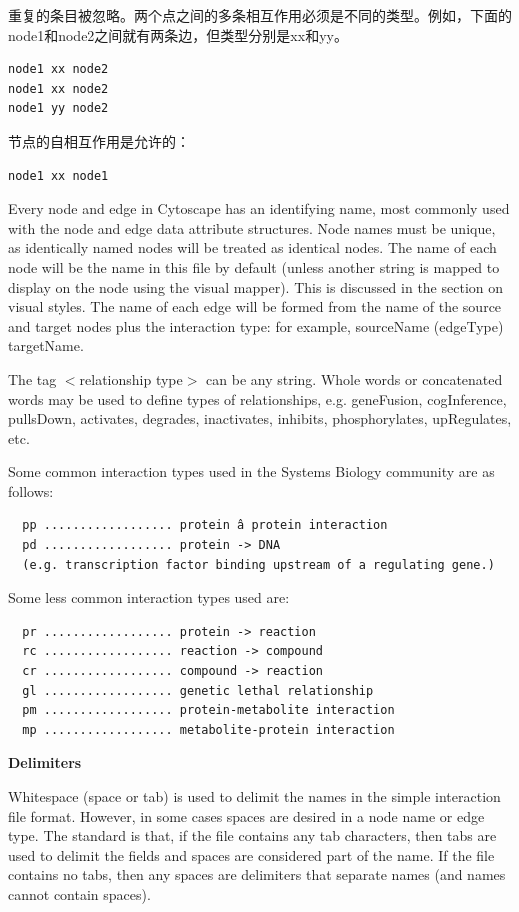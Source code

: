 重复的条目被忽略。两个点之间的多条相互作用必须是不同的类型。例如，下面的node1和node2之间就有两条边，但类型分别是xx和yy。
\begin{verbatim}
node1 xx node2
node1 xx node2
node1 yy node2
\end{verbatim}

节点的自相互作用是允许的：
\begin{verbatim}
node1 xx node1
\end{verbatim}

 Every node and edge in Cytoscape has an identifying name, most commonly used with the node and edge data attribute structures. Node names must be unique, as identically named nodes will be treated as identical nodes. The name of each node will be the name in this file by default (unless another string is mapped to display on the node using the visual mapper). This is discussed in the section on visual styles. The name of each edge will be formed from the name of the source and target nodes plus the interaction type: for example, sourceName (edgeType) targetName. 


 The tag $<$relationship type$>$ can be any string. Whole words or concatenated words may be used to define types of relationships, e.g. geneFusion, cogInference, pullsDown, activates, degrades, inactivates, inhibits, phosphorylates, upRegulates, etc. 


 Some common interaction types used in the Systems Biology community are as follows: 
\begin{verbatim}
  pp .................. protein â protein interaction
  pd .................. protein -> DNA   
  (e.g. transcription factor binding upstream of a regulating gene.)

\end{verbatim}


 Some less common interaction types used are: 
\begin{verbatim}
  pr .................. protein -> reaction
  rc .................. reaction -> compound
  cr .................. compound -> reaction
  gl .................. genetic lethal relationship
  pm .................. protein-metabolite interaction
  mp .................. metabolite-protein interaction

\end{verbatim}


\textbf{Delimiters}

Whitespace (space or tab) is used to delimit the names in the simple interaction file format. However, in some cases spaces are desired in a node name or edge type. The standard is that, if the file contains any tab characters, then tabs are used to delimit the fields and spaces are considered part of the name. If the file contains no tabs, then any spaces are delimiters that separate names (and names cannot contain spaces). 


